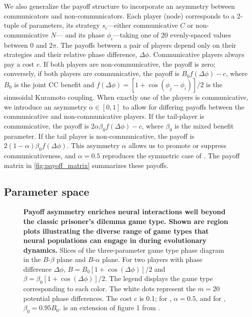 \documentclass[pdflatex,twocolumn,sn-nature,super]{sn-jnl}
\begin{document}
We also generalize the payoff structure to incorporate
an asymmetry between communicators and non-communicators.
Each player (node) corresponds to a 2-tuple of parameters,
its strategy $s_i$---either communicative $C$ or non-communicative $N$---
and its phase $\phi_i$---taking one of \num{20} evenly-spaced values
between $0$ and $2 \pi$.
The payoffs between a pair of players depend only on their strategies
and their relative phase difference, $\Delta \phi$.
Communicative players always pay a cost $c$.
If both players are non-communicative, the payoff is zero;
conversely, if both players are communicative,
the payoff is $B_0 f(\Delta \phi) - c$,
where $B_0$ is the joint CC benefit
and $f(\Delta \phi) = [1+\cos(\phi_j - \phi_i)]/2$
is the sinusoidal Kuramoto coupling.
When exactly one of the players is communicative,
we introduce an asymmetry $\alpha \in [0,1]$ to allow for differing payoffs
between the communicative and non-communicative players.
If the tail-player is communicative,
the payoff is $2 \alpha \beta_0 f(\Delta \phi) - c$,
where $\beta_0$ is the mixed benefit parameter.
If the tail player is non-communicative,
the payoff is $2 (1-\alpha) \beta_0 f(\Delta \phi)$.
This asymmetry $\alpha$ allows us to promote or suppress communicativeness,
and $\alpha = 0.5$ reproduces the symmetric case of \tripp{}.
The payoff matrix in \cref{fig:payoff_matrix} summarizes these payoffs.

\subsection{Parameter space}
\begin{figure*}
  \centering
  \begin{subcaptiongroup}
      {\label{fig:phase-diagram-B_alpha}\captiontext*{}}{%
      {\label{fig:phase-diagram-B_beta}\captiontext*{}}{%
    {}%
  }}
  \end{subcaptiongroup}
  \caption{
    \textbf{
      Payoff asymmetry enriches neural interactions
      well beyond the classic prisoner's dilemma game type.
      Shown are region plots illustrating the diverse range
      of game types that neural populations can engage in
      during evolutionary dynamics.
    }
    Slices of the three-parameter game type phase diagram
    in the
    $B$-$\beta$ plane
    and
    $B$-$\alpha$ plane.
    For two players with phase difference $\Delta \phi$,
    $B = B_0 [1 + \cos(\Delta \phi)]/2$
    and
    $\beta = \beta_0 [1 + \cos(\Delta \phi)]/2$.
    The legend displays the game type corresponding to each color.
    The white dots represent the $m=20$ potential phase differences.
    The cost $c$ is \num{0.1};
    for
    ,
    $\alpha = 0.5$,
    and for
    ,
    $\beta_0 = \num{0.95} B_0$.
    is an extension of figure 1 from \tripp{}.
  }\label{fig:phase-diagram}
\end{figure*}
\end{document}
